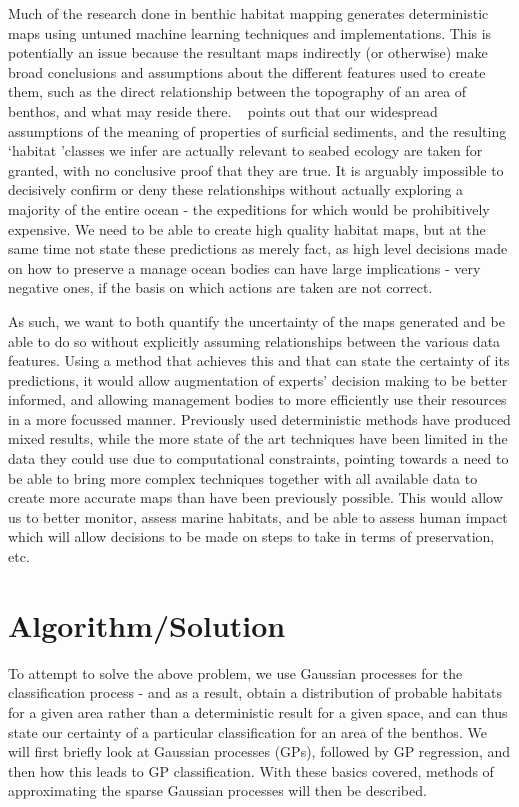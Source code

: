 \documentclass[10pt,sts]{article}
\begin{document}
\begin{multicols}{2}
    Much of the research done in benthic habitat mapping generates deterministic maps using untuned machine learning techniques and implementations. This is potentially an issue  because the resultant maps indirectly (or otherwise) make broad conclusions and assumptions about the different features used to create them, such as the direct relationship between the topography of an area of benthos, and what may reside there. ~\citet{kostylev12} points out that our widespread assumptions of the meaning of properties of surficial sediments, and the resulting \lq habitat \rq classes we infer are actually relevant to seabed ecology are taken for granted, with no conclusive proof that they are true. It is arguably impossible to decisively confirm or deny these relationships without actually exploring a majority of the entire ocean - the expeditions for which would be prohibitively expensive. We need to be able to create high quality habitat maps, but at the same time not state these predictions as merely fact, as high level decisions made on how to preserve a manage ocean bodies can have large implications - very negative ones, if the basis on which actions are taken are not correct.

    As such, we want to both quantify the uncertainty of the maps generated and be able to do so without explicitly assuming relationships between the various data features. Using a method that achieves this and that can state the certainty of its predictions, it would allow augmentation of experts' decision making to be better informed, and allowing management bodies to more efficiently use their resources in a more focussed manner. Previously used deterministic methods have produced mixed results, while the more state of the art techniques have been limited in the data they could use due to computational constraints, pointing towards a need to be able to bring more complex techniques together with all available data to create more accurate maps than have been previously possible. This would allow us to better monitor, assess marine habitats, and be able to assess human impact which will allow decisions to be made on steps to take in terms of preservation, etc.

    \section{Algorithm/Solution}

    To attempt to solve the above problem, we use Gaussian processes for the classification process - and as a result, obtain a distribution of probable habitats for a given area rather than a deterministic result for a given space, and can thus state our certainty of a particular classification for an area of the benthos. We will first briefly look at Gaussian processes (GPs), followed by GP regression, and then how this leads to GP classification. With these basics covered, methods of approximating the sparse Gaussian processes will then be described. 


\end{multicols}
\end{document}
